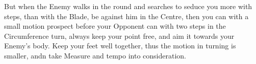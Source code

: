 \newpage


\newpage


But when the Enemy walks in the round and searches to seduce you more
with steps, than with the Blade, be against him in the Centre, then
you can with a small motion prospect before your Opponent can with two
steps in the Circumference turn, always keep your point free, and aim
it towards your Enemy's body. Keep your feet well together, thus the
motion in turning is smaller, andn take Measure and tempo into consideration.



